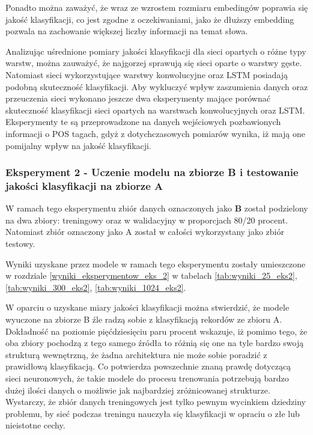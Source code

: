 Ponadto można zaważyć, że wraz ze wzrostem rozmiaru embedingów poprawia się jakość klasyfikacji, co jest zgodne z oczekiwaniami, jako że dłuższy embedding pozwala na zachowanie większej liczby informacji na temat słowa.


Analizując uśrednione pomiary jakości klasyfikacji dla sieci opartych o różne typy warstw, można zauważyć, że najgorzej sprawują się sieci oparte o warstwy gęste. Natomiast sieci wykorzystujące warstwy konwolucyjne oraz LSTM posiadają podobną skuteczność klasyfikacji. Aby wykluczyć wpływ zaszumienia danych oraz przeuczenia sieci wykonano jeszcze dwa eksperymenty mające porównać skuteczność klasyfikacji sieci opartych na warstwach konwolucyjnych oraz LSTM. Eksperymenty te są przeprowadzone na danych wejściowych pozbawionych informacji o POS tagach, gdyż z dotychczasowych pomiarów wynika, iż mają one pomijalny wpływ na jakość klasyfikacji.


\subsubsection{Eksperyment 2 - Uczenie modelu na zbiorze B i testowanie jakości klasyfikacji na zbiorze A }

W ramach tego eksperymentu zbiór danych oznaczonych jako \textbf{B} został podzielony na dwa zbiory: treningowy oraz w walidacyjny w proporcjach 80/20 procent. Natomiast zbiór oznaczony jako A został w całości wykorzystany jako zbiór testowy.

Wyniki uzyskane przez modele w ramach tego eksperymentu zostały umieszczone w rozdziale \ref{wyniki_eksperymentow_eks_2} w tabelach \ref{tab:wyniki_25_eks2}, \ref{tab:wyniki_300_eks2}, \ref{tab:wyniki_1024_eks2}.


W oparciu o uzyskane miary jakości klasyfikacji można stwierdzić, że modele wyuczone na zbiorze B źle radzą sobie z klasyfikacją rekordów ze zbioru A. Dokładność na poziomie pięćdziesięciu paru procent wskazuje, iż pomimo tego, że oba zbiory pochodzą z tego samego źródła to różnią się one na tyle bardzo swoją strukturą wewnętrzną, że żadna architektura nie może sobie poradzić z prawidłową klasyfikacją. Co potwierdza powszechnie znaną prawdę dotyczącą sieci neuronowych, że takie modele do procesu trenowania potrzebują bardzo dużej ilości danych o możliwie jak najbardziej zróżnicowanej strukturze. Wystarczy, że zbiór danych treningowych jest tylko pewnym wycinkiem dziedziny problemu, by sieć podczas treningu nauczyła się klasyfikacji w opraciu o złe lub nieistotne cechy.


